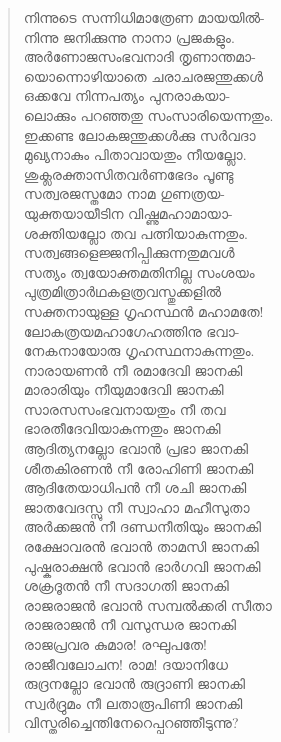 \begin{verse}
നിന്നുടെ സന്നിധിമാത്രേണ മായയില്‍-\\
നിന്നു ജനിക്കുന്നു നാനാ പ്രജകളും.\\
അര്‍ണോജസംഭവനാദി തൃണാന്തമാ-\\
യൊന്നൊഴിയാതെ ചരാചരജന്തുക്കള്‍\\
ഒക്കവേ നിന്നപത്യം പുനരാകയാ-\\
ലൊക്കും പറഞ്ഞതു സംസാരിയെന്നതും.\\
ഇക്കണ്ട ലോകജന്തുക്കള്‍ക്കു സര്‍വദാ\\
മുഖ്യനാകും പിതാവായതും നീയല്ലോ.\\
ശുക്ലരക്താസിതവര്‍ണഭേദം പൂണ്ടു\\
സത്വരജസ്തമോ നാമ ഗുണത്രയ-\\
യുക്തയായീടിന വിഷ്ണുമഹാമായാ-\\
ശക്തിയല്ലോ തവ പത്നിയാകുന്നതും.\\
സത്വങ്ങളെജ്ജനിപ്പിക്കുന്നതുമവള്‍\\
സത്യം ത്വയോക്തമതിനില്ല സംശയം\\
പുത്രമിത്രാര്‍ഥകളത്രവസ്തുക്കളില്‍\\
സക്തനായുള്ള ഗൃഹസ്ഥന്‍ മഹാമതേ!\\
ലോകത്രയമഹാഗേഹത്തിനു ഭവാ-\\
നേകനായോരു ഗൃഹസ്ഥനാകുന്നതും.\\
നാരായണന്‍ നീ രമാദേവി ജാനകി\\
മാരാരിയും നീയുമാദേവി ജാനകി\\
സാരസസംഭവനായതും നീ തവ\\
ഭാരതീദേവിയാകുന്നതും ജാനകി\\
ആദിത്യനല്ലോ ഭവാന്‍ പ്രഭാ ജാനകി\\
ശീതകിരണന്‍ നീ രോഹിണി ജാനകി\\
ആദിതേയാധിപന്‍ നീ ശചി ജാനകി\\
ജാതവേദസ്സു നീ സ്വാഹാ മഹീസുതാ\\
അര്‍ക്കജന്‍ നീ ദണ്ഡനീതിയും ജാനകി\\
രക്ഷോവരന്‍ ഭവാന്‍ താമസി ജാനകി\\
പുഷ്കരാക്ഷന്‍ ഭവാന്‍ ഭാര്‍ഗവി ജാനകി\\
ശക്രദൂതന്‍ നീ സദാഗതി ജാനകി\\
രാജരാജന്‍ ഭവാന്‍ സമ്പല്‍ക്കരി സീതാ\\
രാജരാജന്‍ നീ വസുന്ധര ജാനകി\\
രാജപ്രവര കുമാര! രഘുപതേ!\\
രാജീവലോചന! രാമ! ദയാനിധേ\\
രുദ്രനല്ലോ ഭവാന്‍ രുദ്രാണി ജാനകി\\
സ്വര്‍ദ്രുമം നീ ലതാരൂപിണി ജാനകി\\
വിസ്തരിച്ചെന്തിനേറെപ്പറഞ്ഞീടുന്നു?\\

\end{verse}
